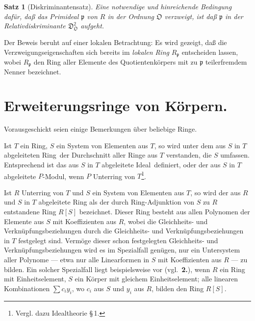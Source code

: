 \documentclass[12pt,a4paper]{article}
\newcommand{\fO}{\mathfrak{O}}
\theoremstyle{plain}
\newtheorem{Satz}{Satz}[section]
\theoremstyle{definition}
\theoremstyle{remark}
\begin{document}
\begin{Satz}[Diskriminantensatz]
Eine notwendige und hinreichende Bedingung dafür, daß das Primideal $\mathfrak{p}$ von $R$ in der Ordnung $\fO$ verzweigt, ist daß $\mathfrak{p}$ in der Relativdiskriminante $\mathfrak{D}_{\fO}^{2}$ aufgeht.
\end{Satz}

Der Beweis beruht auf einer lokalen Betrachtung: Es wird gezeigt, daß die Verzweigungseigenschaften sich bereits im \textit{lokalen Ring} $R_{\mathfrak{p}}$ entscheiden lassen, wobei $R_{\mathfrak{p}}$ den Ring aller Elemente des Quotientenkörpers mit zu $\mathfrak{p}$ teilerfremdem Nenner bezeichnet.

\setcounter{section}{0}
\setcounter{Satz}{0}

\section{Erweiterungsringe von Körpern.}

\noindent
Vorausgeschickt seien einige Bemerkungen über beliebige Ringe.

Ist $T$ ein Ring, $S$ ein System von Elementen aus $T$, so wird unter dem \glqq aus $S$ in $T$ abgeleiteten Ring\grqq\ der Durchschnitt aller Ringe aus $T$ verstanden, die $S$ umfassen. Entsprechend ist das \glqq aus $S$ in $T$ abgeleitete Ideal\grqq\ definiert, oder der \glqq aus $S$ in $T$ abgeleitete $P$-Modul\grqq, wenn $P$ Unterring von $T$\footnote{Vergl. dazu Idealtheorie \S\,1.}.

Ist $R$ Unterring von $T$ und $S$ ein System von Elementen aus $T$, so wird der aus $R$ und $S$ in $T$ abgeleitete Ring als der durch Ring-Adjunktion von $S$ zu $R$ entstandene Ring $R[S]$ bezeichnet. Dieser Ring besteht aus allen Polynomen der Elemente aus $S$ mit Koeffizienten aus $R$, wobei die Gleichheits- und Verknüpfungsbeziehungen durch die Gleichheits- und Verknüpfungsbeziehungen in $T$ festgelegt sind. Vermöge dieser schon festgelegten Gleichheits- und Verknüpfungsbeziehungen wird es im Spezialfall genügen, nur ein Untersystem aller Polynome --- etwa nur alle Linearformen in $S$ mit Koeffizienten aus $R$ --- zu bilden. Ein solcher Spezialfall liegt beispielsweise vor (vgl.\ \textbf{2.}), wenn $R$ ein Ring mit Einheitselement, $S$ ein Körper mit gleichem Einheitselement; alle linearen Kombinationen $\sum c_{i}y_{i}$, wo $c_{i}$ aus $S$ und $y_{i}$ aus $R$, bilden den Ring $R[S]$.
\end{document}

